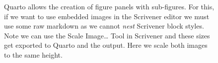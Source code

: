 \documentclass[
  12pt,
  a4paper,
  oneside,
  titlepage,
  toclink=all,
  toc=bibliography]{scrbook}
\theoremstyle{definition}
\theoremstyle{plain}
\theoremstyle{plain}
\theoremstyle{plain}
\theoremstyle{plain}
\theoremstyle{definition}
\theoremstyle{definition}
\theoremstyle{plain}
\theoremstyle{remark}
\begin{document}
\begin{figure}

\begin{minipage}[t]{0.44\linewidth}

{\centering 


}

\end{minipage}%
%
\begin{minipage}[t]{0.56\linewidth}

{\centering 


}

\end{minipage}%

\caption{\label{fig-scriv153}Quarto allows the creation of figure panels
with sub-figures. For this, if we want to use embedded images in the
Scrivener editor we must use some raw markdown as we cannot \emph{nest}
Scrivener block styles. Note we can use the Scale Image\ldots{} Tool in
Scrivener and these sizes get exported to Quarto and the output. Here we
scale both images to the same height.}

\end{figure}
\end{document}

